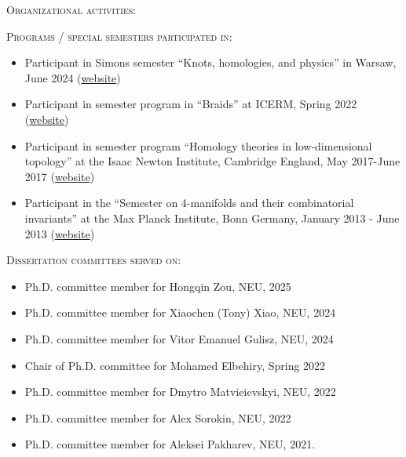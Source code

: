 \documentclass[12pt]{amsart}
\newcommand{\newitem}[1]{\noindent\textsc{#1:}\vskip5pt  }
\begin{document}
\newitem{Organizational activities}
\begin{itemize}\setlength{\itemsep}{4pt}

\newpage
\newitem{Programs / special semesters participated in}

\begin{itemize}\setlength{\itemsep}{4pt}
\item[$\cdot$] Participant in Simons semester ``Knots, homologies, and physics'' in Warsaw, June 2024 (\href{https://simons2024.fuw.edu.pl/}{website})


\item[$\cdot$] Participant in semester program in ``Braids'' at ICERM, Spring 2022 (\href{https://icerm.brown.edu/program/semester_program/sp-s22}{website})


\item[$\cdot$] Participant in semester program ``Homology theories in low-dimensional topology'' at the Isaac Newton Institute, Cambridge England, May 2017-June 2017 (\href{https://api.newton.ac.uk/website/v0/events/htl/reports/scientific-report/}{website})

\item[$\cdot$] Participant in the ``Semester on 4-manifolds and their combinatorial invariants'' at the Max Planck Institute, Bonn Germany, January 2013 - June 2013 (\href{https://people.mpim-bonn.mpg.de/teichner/Math/4-Manifolds.html}{website})
\end{itemize}

\newitem{Dissertation committees served on}
\begin{itemize}\setlength{\itemsep}{5pt}


\item[$\cdot$] Ph.D. committee member for Hongqin Zou, NEU, 2025
\item[$\cdot$] Ph.D. committee member for Xiaochen (Tony) Xiao, NEU, 2024
\item[$\cdot$] Ph.D. committee member for Vitor Emanuel Gulisz, NEU, 2024
\item[$\cdot$] Chair of Ph.D. committee for Mohamed Elbehiry, Spring 2022
\item[$\cdot$] Ph.D. committee member for Dmytro Matvieievskyi, NEU, 2022
\item[$\cdot$] Ph.D. committee member for Alex Sorokin, NEU, 2022

\item[$\cdot$]Ph.D. committee member for Aleksei Pakharev, NEU, 2021. 

\end{itemize}


\end{itemize}
\end{document}
